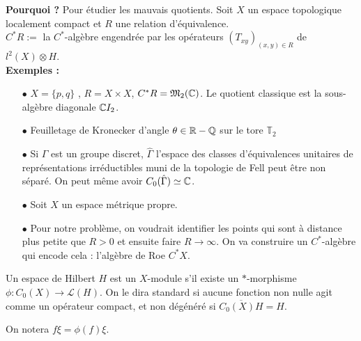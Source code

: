 \documentclass{beamer}
\begin{document}
\begin{frame}
\textbf{Pourquoi ?} 
Pour étudier les mauvais quotients. Soit $X$ un espace topologique localement compact et $R$ une relation d'équivalence.\\
$C^* R :=$ la $C^*$-algèbre engendrée par les opérateurs $(T_{xy})_{(x,y)\in R}$ de $l^2(X)\otimes H$.\\
\textbf{Exemples :}
\begin{itemize}
\item[$\bullet$] $X=\{p,q\}$ , $R=X\times X$, $C^* R = \mathfrak M_2(\mathbb C)$. Le quotient classique est la sous-algèbre diagonale $\mathbb C I_2$.
\item[$\bullet$] Feuilletage de Kronecker d'angle $\theta\in \mathbb R-\mathbb Q$ sur le tore $\mathbb T_2$
\item[$\bullet$] Si $\Gamma$ est un groupe discret, $\hat\Gamma$ l'espace des classes d'équivalences unitaires de représentations irréductibles muni de la topologie de Fell peut être non séparé. On peut même avoir $C_0(\hat \Gamma)\simeq \mathbb C$.
\end{itemize}
\end{frame}

\begin{frame}
\begin{itemize}
\item[$\bullet$] Soit $X$ un espace métrique propre. %
\item[$\bullet$] Pour notre problème, on voudrait identifier les points qui sont à distance plus petite que $R>0$ et ensuite faire $R\rightarrow \infty$. On va construire un $C^*$-algèbre qui encode cela : l'algèbre de Roe $C^* X$.\\
\end{itemize}

\begin{definition}
Un espace de Hilbert $H$ est un $X$-module s'il existe un $*$-morphisme $\phi : C_0(X)\rightarrow \mathcal L(H)$. On le dira standard si aucune fonction non nulle agit comme un opérateur compact, et non dégénéré si $\overline{C_0(X)H}=H$.
\end{definition}
On notera $f\xi= \phi(f)\xi$.
\end{frame}
\end{document}
